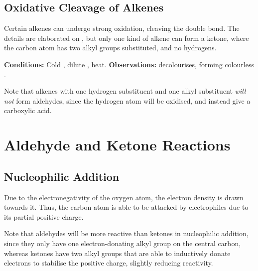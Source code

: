 		\pagebreak
		\subsection{Oxidative Cleavage of Alkenes}

			Certain alkenes can undergo strong oxidation, cleaving the double bond. The details are elaborated on
			\hyperlink{OxidativeCleavageOfAlkenes}{}, but only one kind of alkene can form a ketone, where the carbon
			atom has two alkyl groups substituted, and no hydrogens.

			\vspace{1.5em}
			\vbox{\textbf{Conditions:}	\tabto{35mm}Cold , dilute , heat.}	%
			\vbox{\textbf{Observations:}  decolourises, forming colourless .}



			Note that alkenes with one hydrogen substituent and one alkyl substituent \textit{will not} form aldehydes, since the hydrogen
			atom will be oxidised, and instead give a carboxylic acid.



	\section{Aldehyde and Ketone Reactions}

		\subsection{Nucleophilic Addition}

			Due to the electronegativity of the oxygen atom, the electron density is drawn towards it. Thus, the carbon atom is able
			to be attacked by electrophiles due to its partial positive charge.

			Note that aldehydes will be more reactive than ketones in nucleophilic addition, since they only have one electron-donating
			alkyl group on the central carbon, whereas ketones have two alkyl groups that are able to inductively donate electrons to
			stabilise the positive charge, slightly reducing reactivity.

